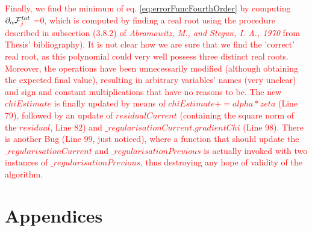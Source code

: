 \documentclass[10pt,a4paper]{article}
\begin{document}
\textcolor{red}{
Finally, we find the minimum of eq. \eqref{eq:errorFuncFourthOrder} by computing $\partial_\alpha \mathcal{F}^{tot}_{\textcolor{red}{j}}$ =0, which is computed by finding a real root using the procedure described in subsection (3.8.2) of \textit{Abramowitz, M., and Stegun, I. A., 1970} from Thesis' bibliography).
It is not clear how we are sure that we find the 'correct' real root, as this polynomial could very well possess three distinct real roots.
Moreover, the operations have been unnecessarily modified (although obtaining the expected final value), resulting in arbitrary variables' names (very unclear) and sign and constant multiplications that have no reasons to be. 
\newline
The new $chiEstimate$ is finally updated by means of $chiEstimate += alpha * zeta$ (Line 79), followed by an update of $residualCurrent$ (containing the square norm of the $residual$, Line 82) and $\_regularisationCurrent.gradientChi$ (Line 98).
\newline
There is another Bug (Line 99, just noticed), where a function that should update the $\_regularisationCurrent$ and $\_regularisationPrevious$ is actually invoked with two instances of $\_regularisationPrevious$, thus destroying any hope of validity of the algorithm.
}

\appendix
\section{Appendices}
\end{document}
